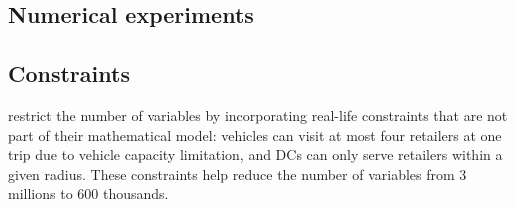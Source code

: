 \documentclass[a4paper,10pt]{article}
\begin{document}
\begin{linenumbers}


\section{Numerical experiments}
\label{sec:expe}

\subsection{Constraints}

 \cite{Zheng2019} restrict the number of variables by incorporating real-life constraints that are not part of their mathematical model: 
 vehicles can visit at most four retailers at one trip due to vehicle capacity limitation, and DCs can only serve retailers within a given radius. 
 These constraints help reduce the number of variables from 3 millions to 600 thousands.
 



\end{linenumbers}
\end{document}
